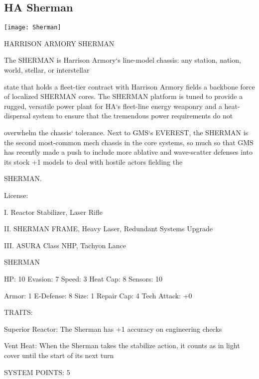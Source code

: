 \subsection{HA Sherman}

\begin{center}
    \texttt{[image: Sherman]}
\end{center}

                              HARRISON ARMORY SHERMAN

The SHERMAN is Harrison Armory‘s line-model chassis: any station, nation, world, stellar, or interstellar

state that holds a fleet-tier contract with Harrison Armory fields a backbone force of localized SHERMAN
cores. The SHERMAN platform is tuned to provide a rugged, versatile power plant for HA‘s fleet-line
energy weaponry and a heat-dispersal system to ensure that the tremendous power requirements do not

overwhelm the chassis‘ tolerance. Next to GMS‘s EVEREST, the SHERMAN is the second most-common
mech chassis in the core systems, so much so that GMS has recently made a push to include more
ablative and wave-scatter defenses into its stock +1 models to deal with hostile actors fielding the

SHERMAN.

                                                  License:

I. Reactor Stabilizer, Laser Rifle

II. SHERMAN FRAME, Heavy Laser, Redundant Systems Upgrade

III. ASURA Class NHP, Tachyon Lance


                                                SHERMAN

 HP: 10         Evasion: 7                            Speed: 3           Heat Cap: 8       Sensors: 10

 Armor: 1       E-Defense: 8                          Size: 1            Repair Cap: 4     Tech Attack:
                                                                                           +0

                                                  TRAITS:

 Superior Reactor: The Sherman has +1 accuracy on engineering checks

 Vent Heat: When the Sherman takes the stabilize action, it counts as in light cover until the start of its
 next turn

                                            SYSTEM POINTS: 5

